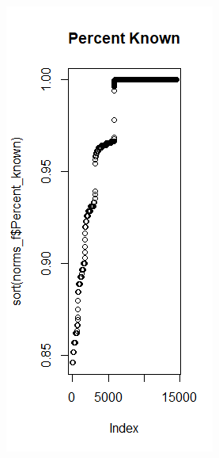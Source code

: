\documentclass[11pt,a4paper]{article}
\begin{document}
\begin{figure}[H]
  \centering
  \begin{subfigure}[b]{0.4\linewidth}
    \includegraphics[width=\linewidth]{images/perc_known_norm.png}

\end{subfigure}
\end{figure}
\end{document}
